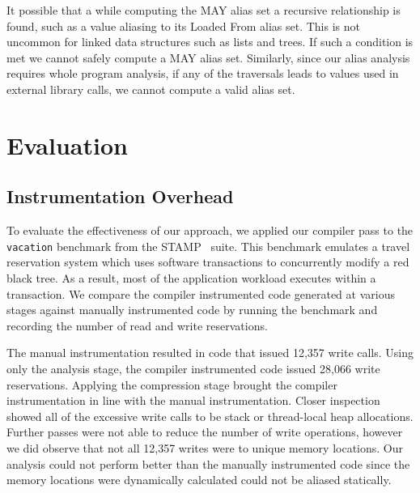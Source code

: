 \documentclass[preprint]{sigplanconf}
\begin{document}
It possible that a while computing the MAY alias set a recursive relationship is found, such as a value aliasing to its Loaded From alias set. This is not uncommon for linked data structures such as lists and trees. If such a condition is met we cannot safely compute a MAY alias set. Similarly, since our alias analysis requires whole program analysis, if any of the traversals leads to values used in external library calls, we cannot compute a valid alias set.

\section{Evaluation}

\subsection{Instrumentation Overhead}

To evaluate the effectiveness of our approach, we applied our compiler pass to the \verb+vacation+ benchmark from the STAMP~\cite{4636089} suite. This benchmark emulates a travel reservation system which uses software transactions to concurrently modify a red black tree. As a result, most of the application workload executes within a transaction. We compare the compiler instrumented code generated at various stages against manually instrumented code by running the benchmark and recording the number of read and write reservations.

The manual instrumentation resulted in code that issued 12,357 write calls. Using only the analysis stage,  the compiler instrumented code issued 28,066 write reservations. Applying the compression stage brought the compiler instrumentation in line with the manual instrumentation. Closer inspection showed all of the excessive write calls to be stack or thread-local heap allocations. Further passes were not able to reduce the number of write operations, however we did observe that not all 12,357 writes were to unique memory locations. Our analysis could not perform better than the manually instrumented code since the memory locations were dynamically calculated could not be aliased statically.
\end{document}
